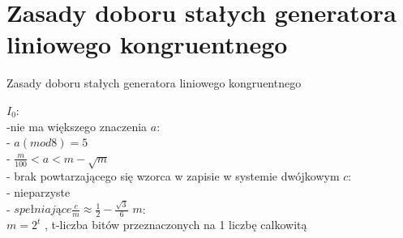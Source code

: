 \section{Zasady doboru stałych generatora liniowego kongruentnego}
	\begin{frame}{Zasady doboru stałych generatora liniowego kongruentnego}

 	 $I_{0}$: \\
 	 -nie ma większego znaczenia
	\newline \newline
	$a$: \\
	- $a(mod 8)=5$ \\
	- $\frac{m}{100}<a<m-\sqrt{m}$ \\
	- brak powtarzającego się wzorca w zapisie w systemie dwójkowym
	\newline \newline
	$c$: \\
	- nieparzyste \\
 	- $spełniające \frac{c}{m}\approx\frac{1}{2}-\frac{\sqrt{3}}{6}$
	\newline \newline
	$m$: \\
	$m=2^{t}$ , \quad t-liczba bitów przeznaczonych na 1 liczbę calkowitą


	\end{frame}
